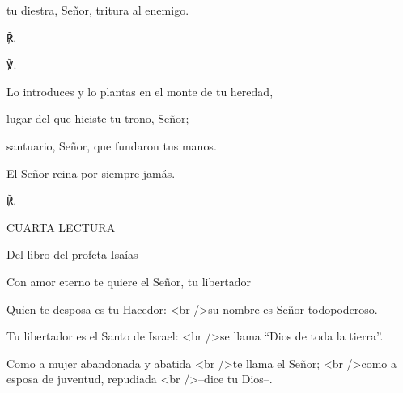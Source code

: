 			\begin{readtabbed}tu diestra, Señor, tritura al enemigo. \begin{readred}℟.\end{readred}\end{readtabbed}
			
			\begin{readbody}\begin{readred}℣.\end{readred} Lo introduces y lo plantas en el monte de tu heredad, \end{readbody}
			
			\begin{readtabbed}lugar del que hiciste tu trono, Señor; \end{readtabbed}
			
			\begin{readtabbed}santuario, Señor, que fundaron tus manos. \end{readtabbed}
			
			\begin{readtabbed}El Señor reina por siempre jamás. \begin{readred}℟.\end{readred}\end{readtabbed}
			
			\begin{readtitle}CUARTA LECTURA\end{readtitle}
			
			\begin{readbook}Del libro del profeta Isaías \end{readbook}
			
			\begin{readtheme}Con amor eterno te quiere el Señor, tu libertador\end{readtheme}
			
			\begin{readtalk}Quien te desposa es tu Hacedor: <br />su nombre es Señor todopoderoso. \end{readtalk}
			
			\begin{readtalk}Tu libertador es el Santo de Israel: <br />se llama “Dios de toda la tierra”. \end{readtalk}
			
			\begin{readtalk}Como a mujer abandonada y abatida <br />te llama el Señor; <br />como a esposa de juventud, repudiada <br />–dice tu Dios–. \end{readtalk}
			
